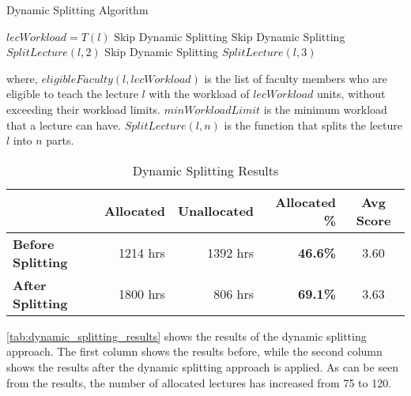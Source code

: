 \begin{algorithm}[H]
  \caption{Dynamic Splitting Algorithm}
  \begin{algorithmic}[1]
    \State $lecWorkload = T(l)$
    \State Skip Dynamic Splitting
    \State Skip Dynamic Splitting
    \State $SplitLecture(l, 2)$
    \State Skip Dynamic Splitting
    \State $SplitLecture(l, 3)$
    \EndIf
    \EndFor
    \EndProcedure
  \end{algorithmic}
  \label{alg:dynamic_splitting}
\end{algorithm}

where, $eligibleFaculty(l, lecWorkload)$ is the list of faculty members who are eligible to teach the lecture $l$ with the workload of $lecWorkload$ units, without exceeding their workload limits. $minWorkloadLimit$ is the minimum workload that a lecture can have. $SplitLecture(l, n)$ is the function that splits the lecture $l$ into $n$ parts.

\begin{table}[H]
  \centering
  \begin{tabular}{|l|r|r|r|c|}
    \hline
    \textbf{}                 & \textbf{Allocated} & \textbf{Unallocated} & \textbf{Allocated \%} & \textbf{Avg Score} \\ \hline
    \textbf{Before Splitting} & 1214 hrs           & 1392 hrs             & \textbf{46.6\%}       & 3.60               \\
    \textbf{After Splitting}  & 1800 hrs           & 806 hrs              & \textbf{69.1\%}       & 3.63               \\ \hline
  \end{tabular}

  \caption{Dynamic Splitting Results}
  \label{tab:dynamic_splitting_results}
\end{table}

\autoref{tab:dynamic_splitting_results} shows the results of the dynamic splitting approach. The first column shows the results before, while the second column shows the results after the dynamic splitting approach is applied. As can be seen from the results, the number of allocated lectures has increased from 75 to 120.

